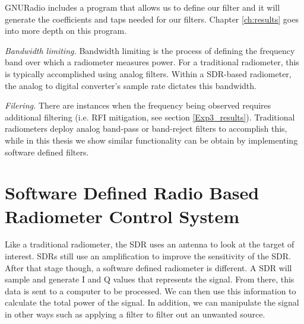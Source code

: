 


GNURadio includes a program that allows us to define our filter and it will generate the coefficients and taps needed for our filters.  Chapter \ref{ch:results} goes into more depth on this program.

\emph{Bandwidth limiting.}  Bandwidth limiting is the process of defining the frequency band over which a radiometer measures power.  For a traditional radiometer, this is typically accomplished using analog filters.  Within a SDR-based radiometer, the analog to digital converter's sample rate dictates this bandwidth.

\emph{Filering.}  There are instances when the frequency being observed requires additional filtering (i.e. RFI mitigation, see section \ref{Exp3_results}).  Traditional radiometers deploy analog band-pass or band-reject filters to accomplish this, while in this thesis we show similar functionality can be obtain by implementing software defined filters. 

\section{Software Defined Radio Based Radiometer Control System}

Like a traditional radiometer, the SDR uses an antenna to look at the target of interest.  SDRs still use an amplification to improve the sensitivity of the SDR. After that stage though, a software defined radiometer is different.  A SDR will sample and generate I and Q values that represents the signal.  From there, this data is sent to a computer to be processed.  We can then use this information to calculate the total power of the signal.  In addition, we can manipulate the signal in other ways such as applying a filter to filter out an unwanted source.

